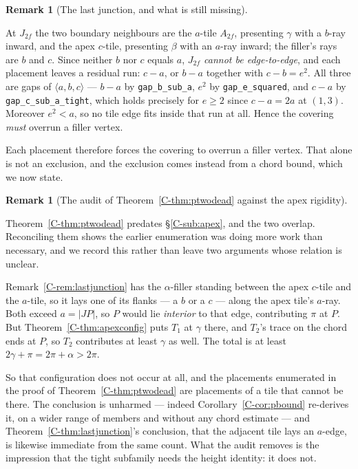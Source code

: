 \documentclass[11pt,reqno]{amsart}
\theoremstyle{plain}
\theoremstyle{definition}
\newtheorem{remark}[theorem]{Remark}
\begin{document}
\begin{remark}[The last junction, and what is still missing]\label{O-lastjunction}

At $J_{2f}$ the two boundary neighbours are the $a$-tile $A_{2f}$, presenting $\gamma$ with a
$b$-ray inward, and the apex $c$-tile, presenting $\beta$ with an \emph{$a$}-ray inward; the filler's
rays are $b$ and $c$. Since neither $b$ nor $c$ equals $a$, \emph{$J_{2f}$ cannot be edge-to-edge},
and each placement leaves a residual run: $c-a$, or $b-a$ together with $c-b=e^2$. All three are gaps
of $\langle a,b,c\rangle$ --- $b-a$ by \texttt{gap\_b\_sub\_a}, $e^2$ by \texttt{gap\_e\_squared},
and $c-a$ by \texttt{gap\_c\_sub\_a\_tight}, which holds precisely for $e\ge2$ since $c-a=2a$ at
$(1,3)$. Moreover $e^2<a$, so no tile edge fits inside that run at all. Hence the covering
\emph{must} overrun a filler vertex.

Each placement therefore forces the covering to overrun a filler vertex. That alone is not an
exclusion, and the exclusion comes instead from a chord bound, which we now state.
\end{remark}

\begin{remark}[The audit of Theorem~\ref{C-thm:ptwodead} against the apex rigidity]\label{O-ptwoaudit}

Theorem~\ref{C-thm:ptwodead} predates \S\ref{C-sub:apex}, and the two overlap. Reconciling them shows the
earlier enumeration was doing more work than necessary, and we record this rather than leave two
arguments whose relation is unclear.

Remark~\ref{C-rem:lastjunction} has the $\alpha$-filler standing between the apex $c$-tile and the
$a$-tile, so it lays one of its flanks --- a $b$ or a $c$ --- along the apex tile's $a$-ray. Both
exceed $a=|JP|$, so $P$ would lie \emph{interior} to that edge, contributing $\pi$ at $P$. But
Theorem~\ref{C-thm:apexconfig} puts $T_1$ at $\gamma$ there, and $T_2$'s trace on the chord ends at $P$,
so $T_2$ contributes at least $\gamma$ as well. The total is at least $2\gamma+\pi=2\pi+\alpha>2\pi$.

So that configuration does not occur at all, and the placements enumerated in the proof of
Theorem~\ref{C-thm:ptwodead} are placements of a tile that cannot be there. The conclusion is unharmed
--- indeed Corollary~\ref{C-cor:pbound} re-derives it, on a wider range of members and without any chord
estimate --- and Theorem~\ref{C-thm:lastjunction}'s conclusion, that the adjacent tile lays an $a$-edge,
is likewise immediate from the same count. What the audit removes is the impression that the tight
subfamily needs the height identity: it does not.
\end{remark}
\end{document}

